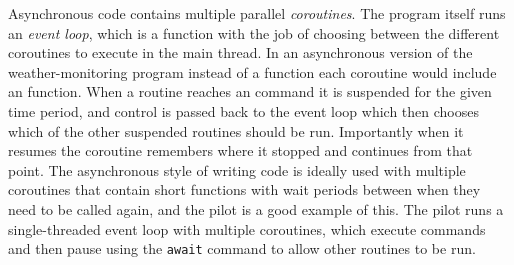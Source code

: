 \begin{colsection}
\begin{colsection}
Asynchronous code contains multiple parallel \textit{coroutines}. The program itself runs an \textit{event loop}, which is a function with the job of choosing between the different coroutines to execute in the main thread. In an asynchronous version of the weather-monitoring program instead of a  function each coroutine would include an  function. When a routine reaches an  command it is suspended for the given time period, and control is passed back to the event loop which then chooses which of the other suspended routines should be run. Importantly when it resumes the coroutine remembers where it stopped and continues from that point. The asynchronous style of writing code is ideally used with multiple coroutines that contain short functions with wait periods between when they need to be called again, and the pilot is a good example of this. The pilot runs a single-threaded event loop with multiple coroutines, which execute commands and then pause using the \texttt{await} command to allow other routines to be run.


\end{colsection}
\end{colsection}
